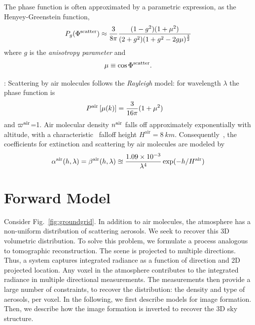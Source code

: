 \documentclass[10pt,twocolumn,letterpaper]{article}
\begin{document}
The phase function is often approximated by a parametric expression, as the Henyey-Greenstein function,
\begin{align}
  P_g(\Phi^{\rm scatter})\approx
   \frac{3} {8\pi}
   \frac{(1 - g^2)(1+\mu^2)}
        {(2+g^2)(1 + g^2 - 2g\mu)^\frac{3}{2}}
  \label{eq:aerosol_scatter}
\end{align}
where $g$ is the {\em anisotropy parameter} and
\begin{align}
  \mu\equiv \cos \Phi^{\rm scatter}.
   \label{eq:mu}
\end{align}

: Scattering by air molecules follows the {\em Rayleigh} model: for wavelength $\lambda$ the phase function is
\begin{align}
  P^{\rm air}\left[\mu(k)\right] &= \frac{3}{16\pi}(1+\mu^2)
  \label{eq:rayleighP}
\end{align}
and $\varpi^{\rm air}$=1. Air molecular density $n^{\rm air}$ falls off approximately exponentially with altitude, with a characteristic~\cite{Levi1980} falloff height $H^\mathrm{air}=8\ km$. Consequently~\cite{Levi1980}, the coefficients for extinction and scattering by air molecules are modeled by
\begin{align}
  \alpha^{\rm air}(h, \lambda)=\beta^{\rm air}(h, \lambda)
  \approxeq 
  \frac{1.09 \times 10^{-3}}{\lambda^4}
  \exp(-h/H^\mathrm{air})  %
  \label{eq:rayleighbeta}
\end{align}





\section{Forward Model}
\label{sec:skymodel} \vspace{-0.2cm}

Consider Fig.~\ref{fig:groundgrid}. In addition to air molecules, the atmosphere has a non-uniform distribution of scattering aerosols. We seek to recover this 3D volumetric distribution. To solve this problem, we formulate a process analogous to tomographic reconstruction. The scene is projected to multiple directions. Thus, a system captures integrated radiance as a function of direction and 2D projected location. Any voxel in the atmosphere contributes to the integrated radiance in multiple directional measurements. The measurements then provide a large number of constraints, to recover the distribution: the density and type of aerosols, per voxel. In the following, we first describe models for image formation. Then, we describe how the image formation is inverted to recover the 3D sky structure.
\end{document}
